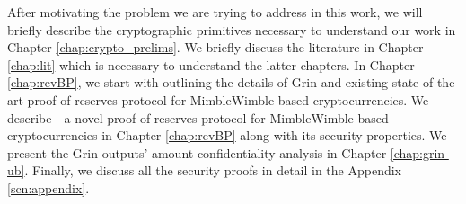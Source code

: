 After motivating the problem we are trying to address in this work, we will briefly describe the cryptographic primitives necessary to understand our work in Chapter \ref{chap:crypto_prelims}.
We briefly discuss the literature in Chapter \ref{chap:lit} which is necessary to understand the latter chapters.  
In Chapter \ref{chap:revBP}, we start with outlining the details of Grin and existing state-of-the-art proof of reserves protocol for MimbleWimble-based cryptocurrencies. 
We describe \RB - a novel proof of reserves protocol for MimbleWimble-based cryptocurrencies in Chapter \ref{chap:revBP} along with its security properties.
We present the Grin outputs' amount confidentiality analysis in Chapter \ref{chap:grin-ub}.
Finally, we discuss all the security proofs in detail in the Appendix \ref{scn:appendix}.  




